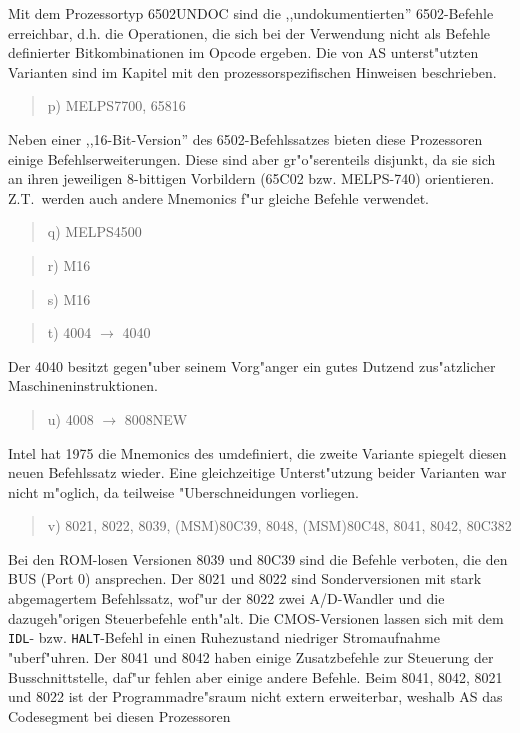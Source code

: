 \documentclass[12pt,a4paper,twoside]{report}
\newcommand{\tty}[1]{{\tt #1}}
\begin{document}
Mit dem Prozessortyp 6502UNDOC sind die ,,undokumentierten''
6502-Befehle erreichbar, d.h. die Operationen, die sich bei der Verwendung
nicht als Befehle definierter Bitkombinationen im Opcode ergeben.  Die von
AS unterst"utzten Varianten sind im Kapitel mit den prozessorspezifischen
Hinweisen beschrieben.
\begin{quote}
p) MELPS7700, 65816
\end{quote}
Neben einer ,,16-Bit-Version'' des 6502-Befehlssatzes bieten diese
Prozessoren einige Befehlserweiterungen.  Diese sind aber gr"o"serenteils
disjunkt, da sie sich an ihren jeweiligen 8-bittigen Vorbildern (65C02
bzw. MELPS-740) orientieren.  Z.T.~werden auch andere Mnemonics f"ur
gleiche Befehle verwendet.
\begin{quote}
q) MELPS4500
\end{quote}
\begin{quote}
r) M16
\end{quote}
\begin{quote}
s) M16
\end{quote}
\begin{quote}
t) 4004 $\rightarrow$ 4040
\end{quote}
Der 4040 besitzt gegen"uber seinem Vorg"anger ein gutes Dutzend
zus"atzlicher Maschineninstruktionen.
\begin{quote}
u) 4008 $\rightarrow$ 8008NEW
\end{quote}
Intel hat 1975 die Mnemonics des umdefiniert, die zweite Variante spiegelt
diesen neuen Befehlssatz wieder.  Eine gleichzeitige Unterst"utzung beider
Varianten war nicht m"oglich, da teilweise "Uberschneidungen vorliegen.
\begin{quote}
v) 8021, 8022, 8039, (MSM)80C39, 8048, (MSM)80C48, 8041, 8042, 80C382
\end{quote}
Bei den ROM-losen Versionen 8039 und 80C39 sind die Befehle verboten,
die den BUS (Port 0) ansprechen.  Der 8021 und 8022 sind Sonderversionen
mit stark abgemagertem Befehlssatz, wof"ur der 8022 zwei A/D-Wandler
und die dazugeh"origen Steuerbefehle enth"alt.  Die CMOS-Versionen lassen
sich mit dem \tty{IDL}- bzw. \tty{HALT}-Befehl in einen Ruhezustand niedriger
Stromaufnahme "uberf"uhren.  Der 8041 und 8042 haben einige Zusatzbefehle zur
Steuerung der Busschnittstelle, daf"ur fehlen aber einige andere Befehle.
Beim 8041, 8042, 8021 und 8022 ist der Programmadre"sraum nicht
extern erweiterbar, weshalb AS das Codesegment bei diesen Prozessoren
\end{document}

